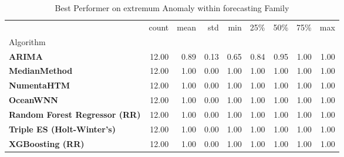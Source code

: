 \begin{table}
\caption{Best Performer on extremum Anomaly within forecasting Family}
\label{tab:bp-extremum_forecasting}
\begin{tabular}{lrrrrrrrr}
\toprule
 & count & mean & std & min & 25\% & 50\% & 75\% & max \\
Algorithm &  &  &  &  &  &  &  &  \\
\midrule
\textbf{ARIMA} & 12.00 & 0.89 & 0.13 & 0.65 & 0.84 & 0.95 & 1.00 & 1.00 \\
\textbf{MedianMethod} & 12.00 & 1.00 & 0.00 & 1.00 & 1.00 & 1.00 & 1.00 & 1.00 \\
\textbf{NumentaHTM} & 12.00 & 1.00 & 0.00 & 1.00 & 1.00 & 1.00 & 1.00 & 1.00 \\
\textbf{OceanWNN} & 12.00 & 1.00 & 0.00 & 1.00 & 1.00 & 1.00 & 1.00 & 1.00 \\
\textbf{Random Forest Regressor (RR)} & 12.00 & 1.00 & 0.00 & 1.00 & 1.00 & 1.00 & 1.00 & 1.00 \\
\textbf{Triple ES (Holt-Winter's)} & 12.00 & 1.00 & 0.00 & 1.00 & 1.00 & 1.00 & 1.00 & 1.00 \\
\textbf{XGBoosting (RR)} & 12.00 & 1.00 & 0.00 & 1.00 & 1.00 & 1.00 & 1.00 & 1.00 \\
\bottomrule
\end{tabular}
\end{table}
